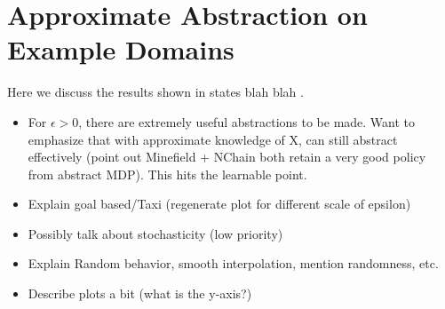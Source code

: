 \section{Approximate Abstraction on Example Domains}

Here we discuss the results shown in states blah blah .


\begin{itemize}
\item For $\epsilon > 0$, there are extremely useful abstractions to be made. Want to emphasize that with approximate knowledge of X, can still abstract effectively (point out Minefield + NChain both retain a very good policy from abstract MDP). This hits the learnable point.
\item Explain goal based/Taxi (regenerate plot for different scale of epsilon)
\item Possibly talk about stochasticity (low priority)
\item Explain Random behavior, smooth interpolation, mention randomness, etc.
\item Describe plots a bit (what is the y-axis?)
\end{itemize}

